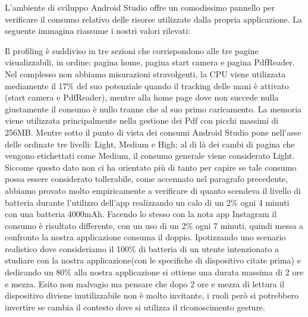 L’ambiente di sviluppo Android Studio offre un comodissimo pannello per verificare il consumo relativo delle risorse utilizzate dalla propria applicazione. La seguente immagina riassume i nostri valori rilevati:


Il profiling è suddiviso in tre sezioni che corrispondono alle tre pagine visualizzabili, in ordine: pagina home, pagina start camera e pagina PdfReader. Nel complesso non abbiamo misurazioni stravolgenti, la CPU viene utilizzata mediamente il 17\% del suo potenziale quando il tracking delle mani è attivato (start camera e PdfReader), mentre alla home page dove non succede nulla giustamente il consumo è nullo tranne che al suo primo caricamento. La memoria viene utilizzata principalmente nella gestione dei Pdf con picchi massimi di 256MB. Mentre sotto il punto di vista dei consumi Android Studio pone nell’asse delle ordinate tre livelli: Light, Medium e High; al di là dei cambi di pagina che vengono etichettati come Medium, il consumo generale viene considerato Light. Siccome questo dato non ci ha orientato più di tanto per capire se tale consumo possa essere considerato tollerabile, come accennato nel paragrafo precedente, abbiamo provato molto empiricamente a verificare di quanto scendeva il livello di batteria durante l’utilizzo dell’app realizzando un calo di un 2\% ogni 4 minuti con una batteria 4000mAh. Facendo lo stesso con la nota app Instagram il consumo è risultato differente, con un uso di un 2\% ogni 7 minuti, quindi messa a confronto la nostra applicazione consuma il doppio. Ipotizzando uno scenario realistico dove consideriamo il 100\% di batteria di un utente intenzionato a studiare con la nostra applicazione(con le specifiche di dispositivo citate prima)  e dedicando un 80\% alla nostra applicazione si ottiene una durata massima di 2 ore e mezza. Esito non malvagio ma pensare che dopo 2 ore e mezza di lettura il dispositivo diviene inutilizzabile non è molto invitante, i ruoli però si potrebbero invertire se cambia il contesto dove si utilizza il riconoscimento gesture.



